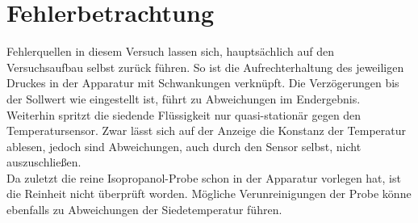 \newpage
\section{Fehlerbetrachtung}
\label{sec:fehler}

Fehlerquellen in diesem Versuch lassen sich, hauptsächlich auf den Versuchsaufbau selbst zurück führen. So ist die Aufrechterhaltung des jeweiligen Druckes in der Apparatur mit Schwankungen verknüpft. Die Verzögerungen bis der Sollwert wie eingestellt ist, führt zu Abweichungen im Endergebnis. \\
Weiterhin spritzt die siedende Flüssigkeit nur quasi-stationär gegen den Temperatursensor. Zwar lässt sich auf der Anzeige die Konstanz der Temperatur ablesen, jedoch sind Abweichungen, auch durch den Sensor selbst, nicht auszuschließen.\\
Da zuletzt die reine Isopropanol-Probe schon in der Apparatur vorlegen hat, ist die Reinheit nicht überprüft worden. Mögliche Verunreinigungen der Probe könne ebenfalls zu Abweichungen der Siedetemperatur führen.
